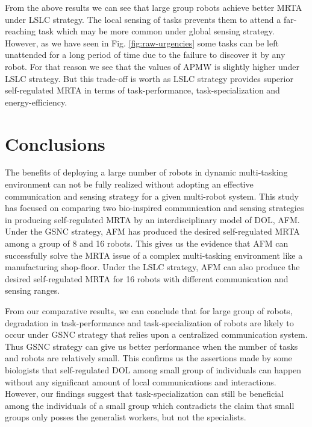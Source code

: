 \documentclass[final,5p,times,twocolumn]{elsarticle}
\begin{document}
From the above results we can see that large group robots achieve better MRTA under LSLC strategy. The local sensing of tasks prevents them to attend a far-reaching task which may be more common under global sensing strategy. However, as we have seen in Fig. \ref{fig:raw-urgencies} some tasks can be left unattended for a long period of time due to the failure to discover it by any robot. For that reason we see that the values of APMW is slightly higher under LSLC strategy. But this trade-off is worth as LSLC strategy provides superior self-regulated MRTA in terms of task-performance, task-specialization and energy-efficiency. 
\section{Conclusions}
\label{sec:conc}
The benefits of deploying a large number of robots in dynamic multi-tasking environment can not be fully realized without adopting an effective communication and sensing strategy for a given multi-robot system. This study has focused on comparing two bio-inspired  communication and sensing strategies in producing self-regulated MRTA by an interdisciplinary model of DOL, AFM. Under the GSNC strategy, AFM has produced the desired self-regulated MRTA among a group of 8 and 16 robots. This gives us the evidence that AFM can successfully solve the MRTA issue of a complex multi-tasking environment like a manufacturing shop-floor. Under the LSLC strategy, AFM can also produce the desired self-regulated MRTA for 16 robots with different communication and sensing ranges.

From our comparative results, we can conclude that for large group of robots,  degradation in  task-performance and task-specialization of robots are likely to occur  under GSNC strategy that relies upon a centralized communication system. Thus GSNC strategy can give us better performance when the number of tasks and robots are relatively small. This confirms us the assertions made by some biologists that self-regulated DOL among small group of individuals can happen without any significant amount of local communications and interactions. However, our findings suggest that task-specialization can still be beneficial among the individuals of a small group which contradicts the claim that small groups only posses the generalist workers, but not the specialists.
\end{document}
